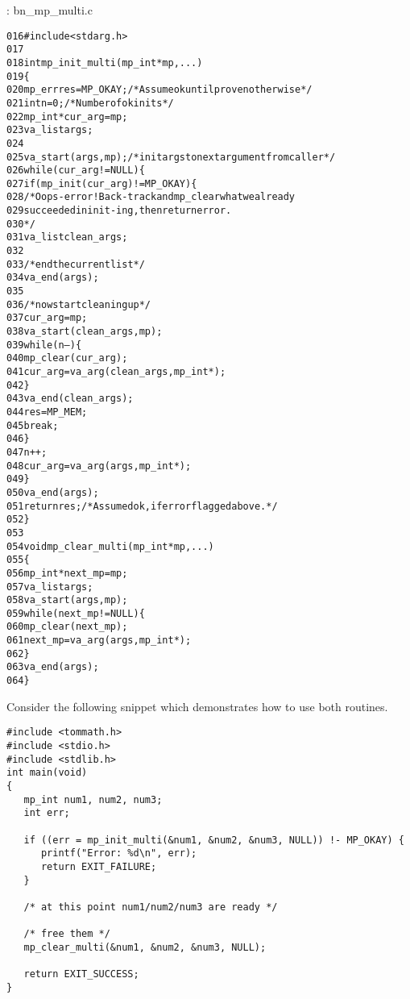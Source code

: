 \documentclass[b5paper]{book}
\begin{document}
\vspace{+3mm}\begin{small}
\hspace{-5.1mm}{\bf File}: bn\_mp\_multi.c
\vspace{-3mm}
\begin{alltt}
016   #include <stdarg.h>
017   
018   int mp_init_multi(mp_int *mp, ...) 
019   \{
020       mp_err res = MP_OKAY;      /* Assume ok until proven otherwise */
021       int n = 0;                 /* Number of ok inits */
022       mp_int* cur_arg = mp;
023       va_list args;
024   
025       va_start(args, mp);        /* init args to next argument from caller */
026       while (cur_arg != NULL) \{
027           if (mp_init(cur_arg) != MP_OKAY) \{
028               /* Oops - error! Back-track and mp_clear what we already
029                  succeeded in init-ing, then return error.
030               */
031               va_list clean_args;
032               
033               /* end the current list */
034               va_end(args);
035               
036               /* now start cleaning up */            
037               cur_arg = mp;
038               va_start(clean_args, mp);
039               while (n--) \{
040                   mp_clear(cur_arg);
041                   cur_arg = va_arg(clean_args, mp_int*);
042               \}
043               va_end(clean_args);
044               res = MP_MEM;
045               break;
046           \}
047           n++;
048           cur_arg = va_arg(args, mp_int*);
049       \}
050       va_end(args);
051       return res;                /* Assumed ok, if error flagged above. */
052   \}
053   
054   void mp_clear_multi(mp_int *mp, ...) 
055   \{
056       mp_int* next_mp = mp;
057       va_list args;
058       va_start(args, mp);
059       while (next_mp != NULL) \{
060           mp_clear(next_mp);
061           next_mp = va_arg(args, mp_int*);
062       \}
063       va_end(args);
064   \}
\end{alltt}
\end{small}

Consider the following snippet which demonstrates how to use both routines.
\begin{small}
\begin{verbatim}
#include <tommath.h>
#include <stdio.h>
#include <stdlib.h>
int main(void)
{
   mp_int num1, num2, num3;
   int err;
   
   if ((err = mp_init_multi(&num1, &num2, &num3, NULL)) !- MP_OKAY) {
      printf("Error: %d\n", err);
      return EXIT_FAILURE;
   }
   
   /* at this point num1/num2/num3 are ready */
   
   /* free them */
   mp_clear_multi(&num1, &num2, &num3, NULL);
   
   return EXIT_SUCCESS;
}
\end{verbatim}
\end{small}
\end{document}
